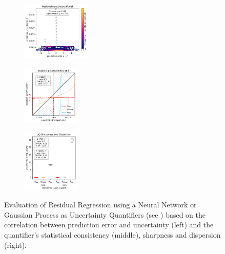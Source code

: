 \begin{figure}[H]
    \begin{subfigure}
    \centering
    \includegraphics[width=0.358\textwidth,valign=t]{uncertainty/figures/uq.residualinputoutputmodel-correlation.pdf}
    \end{subfigure}
    \begin{subfigure}
    \centering
    \includegraphics[width=0.295\textwidth,valign=t]{uncertainty/figures/uq.residualinputoutputmodel-consistency.pdf}
    \end{subfigure}
    \begin{subfigure}
    \centering
    \includegraphics[width=0.297\textwidth,valign=t]{uncertainty/figures/uq.residualinputoutputmodel-sharpness.pdf}
    \end{subfigure}

    \vspace{-1em}
    \caption[Evaluation of Uncertainty Quantifiers based on Residual Regression]{Evaluation of Residual Regression using a Neural Network or Gaussian Process \cite{rio-2019} as Uncertainty Quantifiers (see ) based on the correlation between prediction error and uncertainty (left) and the quantifier's statistical consistency (middle), sharpness and dispersion (right).}
    \label{fig:uncertainty-residual-rio}
\end{figure}

